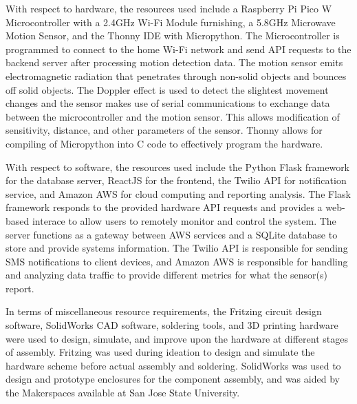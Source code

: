 With respect to hardware, the resources used include a Raspberry Pi Pico W Microcontroller
with a 2.4GHz Wi-Fi Module furnishing, a 5.8GHz Microwave Motion Sensor, and the Thonny IDE
with Micropython. %
The Microcontroller is programmed to connect to the home Wi-Fi network and send API requests to the backend server after processing motion detection data.
The motion sensor emits electromagnetic radiation that penetrates through non-solid objects and bounces
off solid objects. %
The Doppler effect is used to detect the slightest movement changes and the sensor makes use of serial communications to exchange data between the microcontroller
and the motion sensor. %
This allows modification of sensitivity, distance, and other parameters of the sensor. %
Thonny allows for compiling of Micropython into C code to effectively program the hardware. %

With respect to software, the resources used include the Python Flask framework for the
database server, ReactJS for the frontend, the Twilio API for notification service,
and Amazon AWS for cloud computing and reporting analysis. %
The Flask framework responds to the provided hardware API requests and provides a web-based interace to allow users
to remotely monitor and control the system. %
The server functions as a gateway between AWS services and a SQLite database to store and provide systems information. %
The Twilio API is responsible for sending SMS notifications to client devices, and Amazon
AWS is responsible for handling and analyzing data traffic to provide different metrics
for what the sensor(s) report. %

In terms of miscellaneous resource requirements, the Fritzing circuit design software,
SolidWorks CAD software, soldering tools, and 3D printing hardware were used to design,
simulate, and improve upon the hardware at different stages of assembly. %
Fritzing was used during ideation to design and simulate the hardware scheme before actual assembly
and soldering. %
SolidWorks was used to design and prototype enclosures for the
component assembly, and was aided by the Makerspaces available at San Jose State University. %